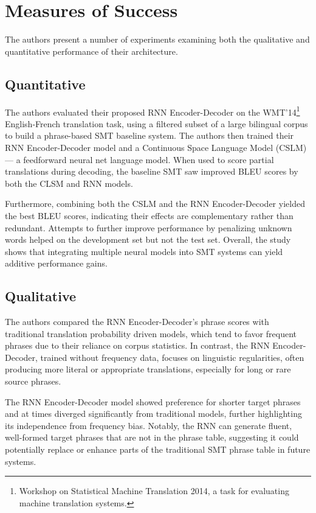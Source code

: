 \documentclass[10pt]{article}
\begin{document}
\section*{Measures of Success}
The authors present a number of experiments examining both the qualitative and quantitative performance of their architecture.
\subsection*{Quantitative}
The authors evaluated their proposed RNN Encoder-Decoder on the WMT'14\footnote{Workshop on Statistical Machine Translation 2014, a task for evaluating machine translation systems.} English-French translation task, using a filtered subset of a large bilingual corpus to build a phrase-based SMT baseline system. The authors then trained their RNN Encoder-Decoder model and a Continuous Space Language Model (CSLM) — a feedforward neural net language model. When used to score partial translations during decoding, the baseline SMT saw improved BLEU scores by both the CLSM and RNN models.

Furthermore, combining both the CSLM and the RNN Encoder-Decoder yielded the best BLEU scores, indicating their effects are complementary rather than redundant. Attempts to further improve performance by penalizing unknown words helped on the development set but not the test set. Overall, the study shows that integrating multiple neural models into SMT systems can yield additive performance gains.

\subsection*{Qualitative}
The authors compared the RNN Encoder-Decoder's phrase scores with traditional translation probability driven models, which tend to favor frequent phrases due to their reliance on corpus statistics. In contrast, the RNN Encoder-Decoder, trained without frequency data, focuses on linguistic regularities, often producing more literal or appropriate translations, especially for long or rare source phrases.

The RNN Encoder-Decoder model showed preference for shorter target phrases and at times diverged significantly from traditional models, further highlighting its independence from frequency bias. Notably, the RNN can generate fluent, well-formed target phrases that are not in the phrase table, suggesting it could potentially replace or enhance parts of the traditional SMT phrase table in future systems.
\end{document}
